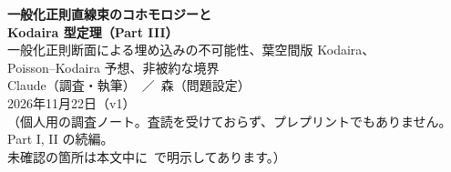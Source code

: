 

\sloppy
\begin{center}
{\LARGE\bfseries\sffamily 一般化正則直線束のコホモロジーと\\[3pt]Kodaira 型定理（Part III）}\\[8pt]
{\large 一般化正則断面による埋め込みの不可能性、葉空間版 Kodaira、\\Poisson--Kodaira 予想、非被約な境界}\\[12pt]
{\large Claude（調査・執筆）\ ／\ 森（問題設定）}\\[3pt]
2026年11月22日（v1）\\[3pt]
{\small （個人用の調査ノート。査読を受けておらず、プレプリントでもありません。Part I, II の続編。\\
未確認の箇所は本文中に\tQ\ で明示してあります。）}
\end{center}
\begin{abstract}\noindent
三種の神器の残り、Kodaira の埋め込み定理の一般化を考える。(1) 一般化正則（GH）断面で射影空間への写像を作る素朴な定式化は成り立たない。$\sigma$ が稠密な開集合で非退化なら $\dim\HH^0(L)\le1$（命題 \ref{prop:one}）、正則型で型が $k<n$ なら GH 断面は葉に沿って定数で写像は埋め込みにならない（命題 \ref{prop:leaf}）。$\mathbb{CP}^2$ の Poisson 3次曲線と $\mathbb{P}^1\times\mathbb{P}^1$ の $(2,2)$ 曲線の例で確認した。(2) 正則型で葉空間が射影的な場合の Kodaira（定理 \ref{thm:K1}）：写像は古典の Kodaira 埋め込みと射影の合成になる。簡単な帰着であり、文献には見つからなかった。(3) 新しい定式化として Poisson--Kodaira（Poisson 対 $(X,\sigma)$ の $\mathbb{P}^N$ への Poisson 埋め込み）を提案し、トーリック・トーラス不変な $\sigma$ では証明（定理 \ref{thm:PKtoric}）、$\mathbb{P}^2$ の 4 つの 3 次式で $m=2$ のとき数値的に確認、一般には予想（予想 \ref{conj:PK}）とする。(4) 非被約な境界、準斉次な特異点の局所公式（訂正を含む）、積の場合の Künneth を整理した。一般の一般化複素構造に対する Kodaira 埋め込みの結果は見つかっていない。
\end{abstract}


